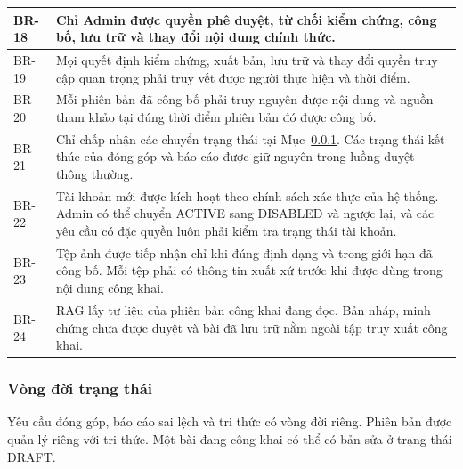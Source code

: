 \begin{longtable}{|L{20mm}|L{124mm}|}
BR-18 & Chỉ Admin được quyền phê duyệt, từ chối kiểm chứng, công bố, lưu trữ và thay đổi nội dung chính thức.\\\hline
BR-19 & Mọi quyết định kiểm chứng, xuất bản, lưu trữ và thay đổi quyền truy cập quan trọng phải truy vết được người thực hiện và thời điểm.\\\hline
BR-20 & Mỗi phiên bản đã công bố phải truy nguyên được nội dung và nguồn tham khảo tại đúng thời điểm phiên bản đó được công bố.\\\hline
BR-21 & Chỉ chấp nhận các chuyển trạng thái tại Mục~\ref{sec:chapter3-lifecycle}. Các trạng thái kết thúc của đóng góp và báo cáo được giữ nguyên trong luồng duyệt thông thường.\\\hline
BR-22 & Tài khoản mới được kích hoạt theo chính sách xác thực của hệ thống. Admin có thể chuyển ACTIVE sang DISABLED và ngược lại, và các yêu cầu có đặc quyền luôn phải kiểm tra trạng thái tài khoản.\\\hline
BR-23 & Tệp ảnh được tiếp nhận chỉ khi đúng định dạng và trong giới hạn đã công bố. Mỗi tệp phải có thông tin xuất xứ trước khi được dùng trong nội dung công khai.\\\hline
BR-24 & RAG lấy tư liệu của phiên bản công khai đang đọc. Bản nháp, minh chứng chưa được duyệt và bài đã lưu trữ nằm ngoài tập truy xuất công khai.\\\hline
\end{longtable}

\ReportNeedSpace{48mm}
\subsubsection{Vòng đời trạng thái}
\label{sec:chapter3-lifecycle}
Yêu cầu đóng góp, báo cáo sai lệch và tri thức có vòng đời riêng. Phiên bản được quản lý
riêng với tri thức. Một bài đang công khai có thể có bản sửa ở trạng thái DRAFT.


